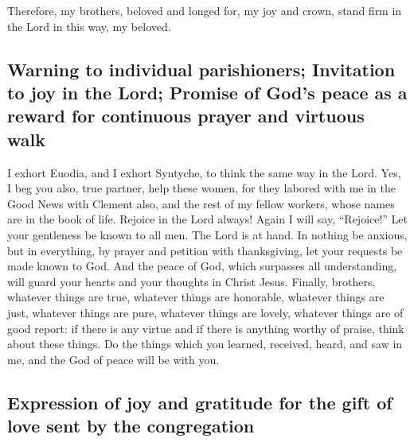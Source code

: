  Therefore, my brothers, beloved and longed for, my joy
and crown, stand firm in the Lord in this way, my beloved.

\hypertarget{warning-to-individual-parishioners-invitation-to-joy-in-the-lord-promise-of-gods-peace-as-a-reward-for-continuous-prayer-and-virtuous-walk}{%
\subsection{Warning to individual parishioners; Invitation to joy in the
Lord; Promise of God's peace as a reward for continuous prayer and
virtuous
walk}\label{warning-to-individual-parishioners-invitation-to-joy-in-the-lord-promise-of-gods-peace-as-a-reward-for-continuous-prayer-and-virtuous-walk}}

 I exhort Euodia, and I exhort Syntyche, to think the same
way in the Lord.  Yes, I beg you also, true partner, help
these women, for they labored with me in the Good News with Clement
also, and the rest of my fellow workers, whose names are in the book of
life.  Rejoice in the Lord always! Again I will say,
``Rejoice!''  Let your gentleness be known to all men. The
Lord is at hand.  In nothing be anxious, but in
everything, by prayer and petition with thanksgiving, let your requests
be made known to God.  And the peace of God, which
surpasses all understanding, will guard your hearts and your thoughts in
Christ Jesus.  Finally, brothers, whatever things are
true, whatever things are honorable, whatever things are just, whatever
things are pure, whatever things are lovely, whatever things are of good
report: if there is any virtue and if there is anything worthy of
praise, think about these things.  Do the things which you
learned, received, heard, and saw in me, and the God of peace will be
with you.

\hypertarget{expression-of-joy-and-gratitude-for-the-gift-of-love-sent-by-the-congregation}{%
\subsection{Expression of joy and gratitude for the gift of love sent by
the
congregation}\label{expression-of-joy-and-gratitude-for-the-gift-of-love-sent-by-the-congregation}}

